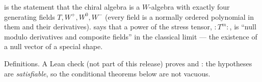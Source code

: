 \begin{physics}
 is the statement that the chiral algebra is a $W$-algebra with exactly four
generating fields $T,W^+,W^0,W^-$ (every field is a normally ordered polynomial in them and their
derivatives).  says that a power of the stress tensor, $:T^m:$, is ``null modulo
derivatives and composite fields'' in the classical limit --- the existence of a null vector of a
special shape.
\end{physics}
\begin{status}
Definitions. A Lean check (not part of this release) proves
 and : the hypotheses are \emph{satisfiable}, so the
conditional theorems below are not vacuous.
\end{status}

